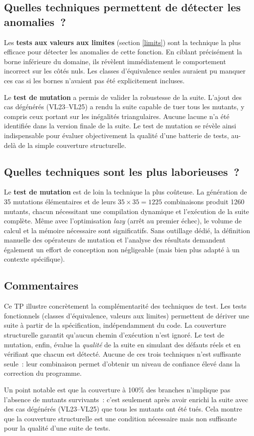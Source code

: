 \documentclass[a4paper,11pt]{article}
\begin{document}
\subsection{Quelles techniques permettent de détecter les anomalies~?}

Les \textbf{tests aux valeurs aux limites} (section \ref{limits}) sont la technique la plus efficace pour détecter les anomalies de cette fonction. En ciblant précisément la borne inférieure du domaine, ils révèlent immédiatement le comportement incorrect sur les côtés nuls. Les classes d'équivalence seules auraient pu manquer ces cas si les bornes n'avaient pas été explicitement incluses.

Le \textbf{test de mutation} a permis de valider la robustesse de la suite. L’ajout des cas dégénérés (VL23–VL25) a rendu la suite capable de tuer tous les mutants, y compris ceux portant sur les inégalités triangulaires. Aucune lacune n’a été identifiée dans la version finale de la suite. Le test de mutation se révèle ainsi indispensable pour évaluer objectivement la qualité d’une batterie de tests, au-delà de la simple couverture structurelle.

\subsection{Quelles techniques sont les plus laborieuses~?}

Le \textbf{test de mutation} est de loin la technique la plus coûteuse. La génération de 35 mutations élémentaires et de leurs $35 \times 35 = 1225$ combinaisons produit 1260 mutants, chacun nécessitant une compilation dynamique et l'exécution de la suite complète. Même avec l'optimisation \textit{lazy} (arrêt au premier échec), le volume de calcul et la mémoire nécessaire sont significatifs. Sans outillage dédié, la définition manuelle des opérateurs de mutation et l'analyse des résultats demandent également un effort de conception non négligeable (mais bien plus adapté à un contexte spécifique).

\subsection{Commentaires}

Ce TP illustre concrètement la complémentarité des techniques de test. Les tests fonctionnels (classes d'équivalence, valeurs aux limites) permettent de dériver une suite à partir de la spécification, indépendamment du code. La couverture structurelle garantit qu'aucun chemin d'exécution n'est ignoré. Le test de mutation, enfin, évalue la \textit{qualité} de la suite en simulant des défauts réels et en vérifiant que chacun est détecté. Aucune de ces trois techniques n'est suffisante seule~: leur combinaison permet d'obtenir un niveau de confiance élevé dans la correction du programme.

Un point notable est que la couverture à 100\% des branches n'implique pas l'absence de mutants survivants~: c’est seulement après avoir enrichi la suite avec des cas dégénérés (VL23–VL25) que tous les mutants ont été tués. Cela montre que la couverture structurelle est une condition nécessaire mais non suffisante pour la qualité d'une suite de tests.
\end{document}
